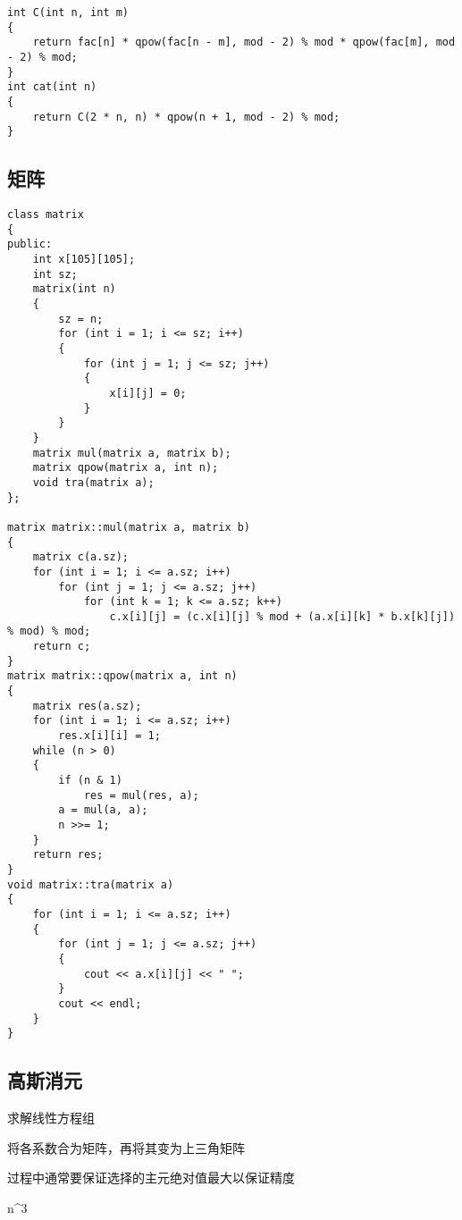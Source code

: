 \documentclass[]{article}
\begin{document}
\begin{verbatim}
int C(int n, int m)
{
    return fac[n] * qpow(fac[n - m], mod - 2) % mod * qpow(fac[m], mod - 2) % mod;
}
int cat(int n)
{
    return C(2 * n, n) * qpow(n + 1, mod - 2) % mod;
}
\end{verbatim}

\hypertarget{ux77e9ux9635}{%
\subsection{矩阵}\label{ux77e9ux9635}}

\begin{verbatim}
class matrix
{
public:
    int x[105][105];
    int sz;
    matrix(int n)
    {
        sz = n;
        for (int i = 1; i <= sz; i++)
        {
            for (int j = 1; j <= sz; j++)
            {
                x[i][j] = 0;
            }
        }
    }
    matrix mul(matrix a, matrix b);
    matrix qpow(matrix a, int n);
    void tra(matrix a);
};

matrix matrix::mul(matrix a, matrix b)
{
    matrix c(a.sz);
    for (int i = 1; i <= a.sz; i++)
        for (int j = 1; j <= a.sz; j++)
            for (int k = 1; k <= a.sz; k++)
                c.x[i][j] = (c.x[i][j] % mod + (a.x[i][k] * b.x[k][j]) % mod) % mod;
    return c;
}
matrix matrix::qpow(matrix a, int n)
{
    matrix res(a.sz);
    for (int i = 1; i <= a.sz; i++)
        res.x[i][i] = 1;
    while (n > 0)
    {
        if (n & 1)
            res = mul(res, a);
        a = mul(a, a);
        n >>= 1;
    }
    return res;
}
void matrix::tra(matrix a)
{
    for (int i = 1; i <= a.sz; i++)
    {
        for (int j = 1; j <= a.sz; j++)
        {
            cout << a.x[i][j] << " ";
        }
        cout << endl;
    }
}
\end{verbatim}

\hypertarget{ux9ad8ux65afux6d88ux5143}{%
\subsection{高斯消元}\label{ux9ad8ux65afux6d88ux5143}}

求解线性方程组

将各系数合为矩阵，再将其变为上三角矩阵

过程中通常要保证选择的主元绝对值最大以保证精度

n\^{}3
\end{document}
